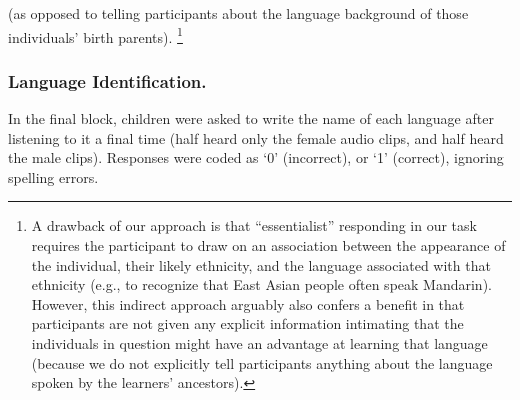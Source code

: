 \documentclass{foushee-adapted-preprint}
\begin{document}
(as opposed to telling participants about the language background of those individuals' birth parents).%
\footnote{A drawback of our approach is that ``essentialist'' responding in our task requires the participant to draw on an association between the appearance of the individual, their likely ethnicity, and the language associated with that ethnicity (e.g., to recognize that East Asian people often speak Mandarin). 
However, this indirect approach arguably also confers a benefit in that participants are not given any explicit information intimating that the individuals in question might have an advantage at learning that language (because we do not explicitly tell participants anything about the language spoken by the learners' ancestors).}  

\subsubsection{Language Identification.}
In the final block, children were asked to write the name of each language after listening to it a final time (half heard only the female audio clips, and half heard the male clips). Responses were coded as `0' (incorrect), or `1' (correct), ignoring spelling errors.
\end{document}
